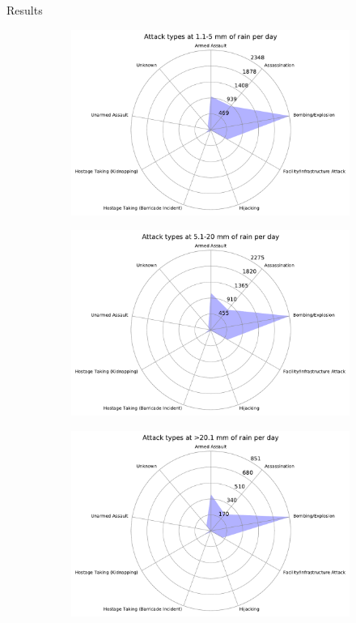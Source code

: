\documentclass{beamer}
\begin{document}
\begin{frame}{Results}
\begin{figure}
		\begin{subfigure}[b]{0.3\textwidth}
			\includegraphics[width=\textwidth]{Rain-Attack/rain11-5_starDiagram}
		\end{subfigure}
	\end{figure}
	\begin{figure}
		\begin{subfigure}[b]{0.3\textwidth}
			\includegraphics[width=\textwidth]{Rain-Attack/rain51-20_starDiagram}
		\end{subfigure}
		\begin{subfigure}[b]{0.3\textwidth}
			\includegraphics[width=\textwidth]{Rain-Attack/rain>201_starDiagram}
		\end{subfigure}
	\end{figure}
	

\end{frame}
\end{document}
